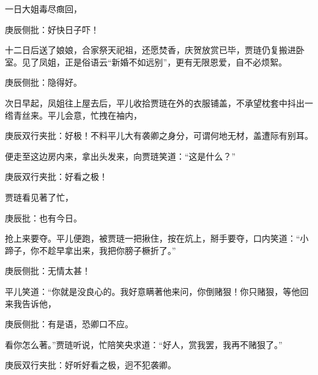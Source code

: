 \begin{parag}


    一日大姐毒尽癍回，\begin{note}庚辰侧批：好快日子吓！\end{note}十二日后送了娘娘，合家祭天祀祖，还愿焚香，庆贺放赏已毕，贾琏仍复搬进卧室。见了凤姐，正是俗语云“新婚不如远别”，更有无限恩爱，自不必烦絮。\begin{note}庚辰侧批：隐得好。\end{note}
\end{parag}


\begin{parag}


    次日早起，凤姐往上屋去后，平儿收拾贾琏在外的衣服铺盖，不承望枕套中抖出一绺青丝来。平儿会意，忙拽在袖内，\begin{note}庚辰双行夹批：好极！不料平儿大有袭卿之身分，可谓何地无材，盖遭际有别耳。\end{note}便走至这边房内来，拿出头发来，向贾琏笑道：“这是什么？”\begin{note}庚辰双行夹批：好看之极！\end{note}贾琏看见著了忙，\begin{note}庚辰批：也有今日。\end{note}抢上来要夺。平儿便跑，被贾琏一把揪住，按在炕上，掰手要夺，口内笑道：“小蹄子，你不趁早拿出来，我把你膀子橛折了。”\begin{note}庚辰侧批：无情太甚！\end{note}平儿笑道：“你就是没良心的。我好意瞒著他来问，你倒赌狠！你只赌狠，等他回来我告诉他，\begin{note}庚辰侧批：有是语，恐卿口不应。\end{note}看你怎么著。”贾琏听说，忙陪笑央求道：“好人，赏我罢，我再不赌狠了。”\begin{note}庚辰双行夹批：好听好看之极，迥不犯袭卿。\end{note}
\end{parag}


